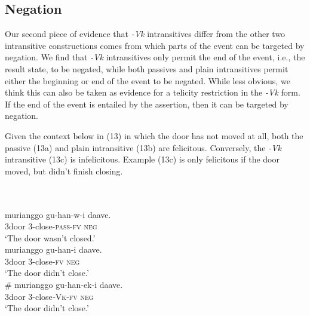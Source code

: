 \documentclass[output=paper]{langsci/langscibook}
\begin{document}
\subsection{Negation} 

Our second piece of evidence that \textit{-Vk }intransitives differ from the other two intransitive constructions comes from which parts of the event can be targeted by negation. We find that \textit{-Vk }intransitives only permit the end of the event, i.e., the result state, to be negated, while both passives and plain intransitives permit either the beginning or end of the event to be negated. While less obvious, we think this can also be taken as evidence for a telicity restriction in the \textit{-Vk} form. If the end of the event is entailed by the assertion, then it can be targeted by negation. 

Given the context below in (13) in which the door has not moved at all, both the passive (13a) and plain intransitive (13b) are felicitous. Conversely, the \textit{-Vk} intransitive (13c) is infelicitous. Example (13c) is only felicitous if the door moved, but didn’t finish closing.

\ea\label{exx:}
{}\\
\ea\label{ex:}
\\
\gll   murianggo gu-han-w-i           daave.\\
       3door        3-close-\textsc{pass}-\textsc{fv}    \textsc{neg}\\
\glt ‘The door wasn’t closed.’
\ex
{}\\
\gll \textbf{  }murianggo gu-han-i     daave.\\
     \textit{  }3door         3-close-\textsc{fv}  \textsc{neg}\\
\glt ‘The door didn’t close.’
\ex
{}\\
\gll \textbf{  }\# murianggo gu-han-ek-i      daave.\\
     \textit{     }3door         3-close\textit{-}\textsc{Vk}-\textsc{fv}   \textsc{neg}\\
\glt ‘The door didn’t close.’
\z
\z
\end{document}
